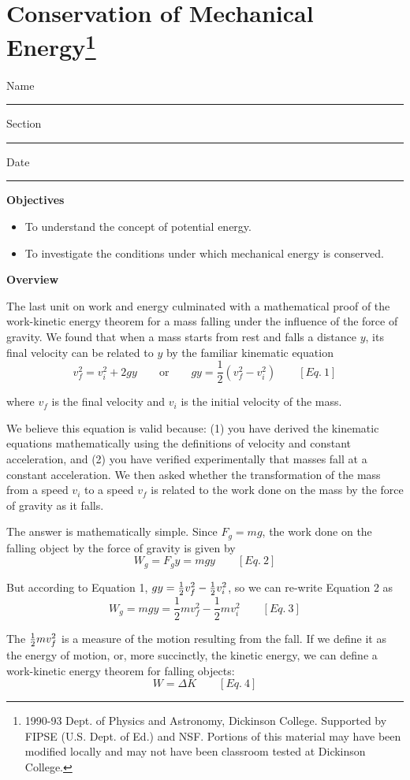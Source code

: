 
\section{Conservation of Mechanical Energy\footnote{
1990-93 Dept. of Physics and Astronomy, Dickinson College. Supported by FIPSE
(U.S. Dept. of Ed.) and NSF. Portions of this material may have been modified
locally and may not have been classroom tested at Dickinson College.
}}

Name \rule{2.0in}{0.1pt}\hfill{}Section \rule{1.0in}{0.1pt}\hfill{}Date \rule{1.0in}{0.1pt}

\textbf{Objectives }

\begin{itemize}
\item To understand the concept of potential energy. 
\item To investigate the conditions under which mechanical energy is conserved.
\end{itemize}
\textbf{Overview }

The last unit on work and energy culminated with a mathematical proof of the
work-kinetic energy theorem for a mass falling under the influence of the 
force of gravity. We found that when a mass starts from rest and falls a 
distance $y$, its final velocity can be related to $y$ by the familiar 
kinematic equation
\[
v_{f}^{2}=v_{i}^{2}+2gy\qquad \mbox{or}
\qquad gy=\frac{1}{2}\left( v_{f}^{2}-v_{i}^{2}\right) \qquad [Eq.\: 1]\]


where \( v_{f} \) is the final velocity and \( v_{i} \) is the initial velocity
of the mass.

We believe this equation is valid because: (1) you have derived the kinematic
equations mathematically using the definitions of velocity and constant 
acceleration, and (2) you have verified experimentally that masses fall at a 
constant acceleration.
We then asked whether the transformation of the mass from a speed \( v_{i} \)
to a speed \( v_{f} \) is related to the work done on the mass by the force
of gravity as it falls.

The answer is mathematically simple. Since \( F_{g}=mg \), the work done
on the falling object by the force of gravity is given by
\[
W_{g}=F_{g}y=mgy\qquad [Eq.\: 2]\]


But according to Equation 1, \(gy = {1\over 2} v_{f}^{2} - {1\over 2} 
v_{i}^{2} \),
so we can re-write Equation 2 as
\[
W_{g}=mgy=\frac{1}{2}mv_{f}^{2}-\frac{1}{2}mv_{i}^{2}\qquad [Eq.\: 3]\]


The \({1\over 2}mv_{f}^{2} \) is a measure of the motion resulting from the fall.
If we define it as the energy of motion, or, more succinctly, the kinetic 
energy, we can define a work-kinetic energy theorem for falling objects:
\[
W=\Delta K\qquad [Eq.\: 4]\]


